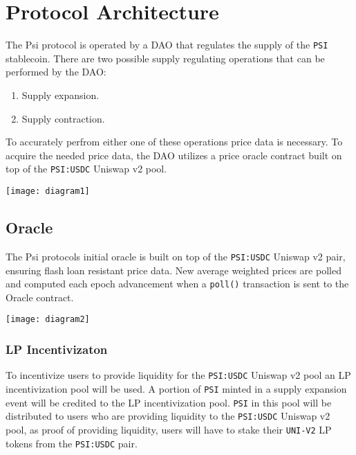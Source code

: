 \documentclass[a4paper, 12pt]{article}
\begin{document}
	\section{Protocol Architecture}
	The Psi protocol is operated by a DAO that regulates the supply of the \texttt{PSI} stablecoin. There are two possible supply regulating operations that can be performed by the DAO:

	\begin{enumerate}

		\item{Supply expansion.}
		\item{Supply contraction.}

	\end{enumerate}

	To accurately perfrom either one of these operations price data is necessary. To acquire the needed price data, the DAO utilizes a price oracle contract built on top of the \texttt{PSI:USDC} Uniswap v2 pool. 
	
	\begin{center}

		\texttt{[image: diagram1]}

	\end{center}

	\newpage

	\subsection{Oracle}
	The Psi protocols initial oracle is built on top of the \texttt{PSI:USDC} Uniswap v2 pair, ensuring flash loan resistant price data. New average weighted prices are polled and computed each epoch 				advancement when a \texttt{poll()} transaction is sent to the Oracle contract.

	\begin{center}

		\texttt{[image: diagram2]}
	
	\end{center}
	
	\subsubsection{LP Incentivizaton}
	To incentivize users to provide liquidity for the \texttt{PSI:USDC} Uniswap v2 pool an LP incentivization pool will be used. A portion of \texttt{PSI} minted in a supply expansion event will be credited to 	the LP incentivization pool. \texttt{PSI} in this pool will be distributed to users who are providing liquidity to the \texttt{PSI:USDC} Uniswap v2 pool, as proof of providing liquidity, users will have to 			stake their \texttt{UNI-V2} LP tokens from the \texttt{PSI:USDC} pair.
\end{document}
